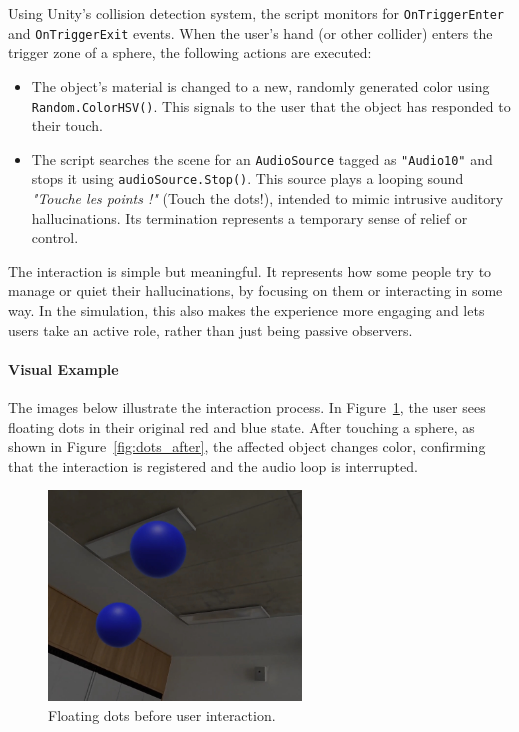 \vspace{1em}

Using Unity's collision detection system, the script monitors for \texttt{OnTriggerEnter} and \texttt{OnTriggerExit} events. When the user's hand (or other collider) enters the trigger zone of a sphere, the following actions are executed:

\begin{itemize}
    \item The object's material is changed to a new, randomly generated color using \texttt{Random.ColorHSV()}. This signals to the user that the object has responded to their touch.
    \item The script searches the scene for an \texttt{AudioSource} tagged as \texttt{"Audio10"} and stops it using \texttt{audioSource.Stop()}. This source plays a looping sound \textit{"Touche les points !"} (Touch the dots!), intended to mimic intrusive auditory hallucinations. Its termination represents a temporary sense of relief or control.
\end{itemize}

The interaction is simple but meaningful. It represents how some people try to manage or quiet their hallucinations, by focusing on them or interacting in some way. In the simulation, this also makes the experience more engaging and lets users take an active role, rather than just being passive observers.

\paragraph{Visual Example}
The images below illustrate the interaction process. In Figure~\ref{fig:dots_before}, the user sees floating dots in their original red and blue state. After touching a sphere, as shown in Figure~\ref{fig:dots_after}, the affected object changes color, confirming that the interaction is registered and the audio loop is interrupted.

\begin{figure}[H]
    \centering
    \includegraphics[width=0.6\textwidth]{../../Figures/dots-video.jpg}
    \caption{Floating dots before user interaction.}
    \label{fig:dots_before}
\end{figure}

